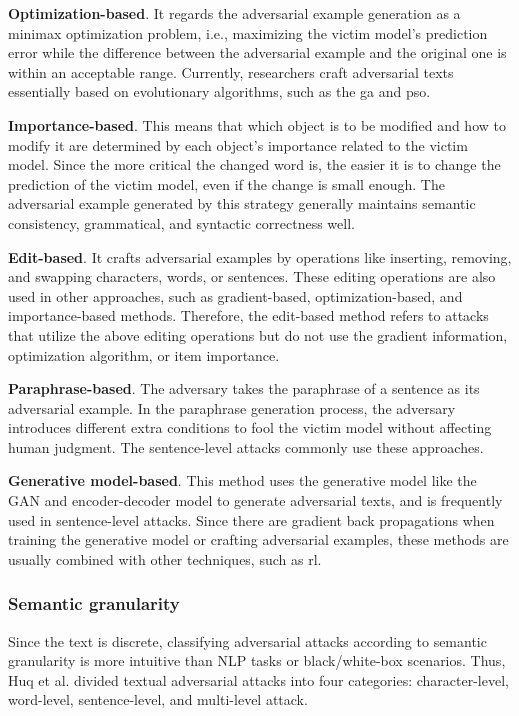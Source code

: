 \textbf{Optimization-based}. It regards the adversarial example generation as a minimax optimization problem, i.e., maximizing the victim model's prediction error while the difference between the adversarial example and the original one is within an acceptable range. Currently, researchers craft adversarial texts essentially based on evolutionary algorithms, such as the \acrshort{ga} and \acrshort{pso}.

\textbf{Importance-based}. This means that which object is to be modified and how to modify it are determined by each object's importance related to the victim model. Since the more critical the changed word is, the easier it is to change the prediction of the victim model, even if the change is small enough. The adversarial example generated by this strategy generally maintains semantic consistency, grammatical, and syntactic correctness well.

\textbf{Edit-based}. It crafts adversarial examples by operations like inserting, removing, and swapping characters, words, or sentences. These editing operations are also used in other approaches, such as gradient-based, optimization-based, and importance-based methods. Therefore, the edit-based method refers to attacks that utilize the above editing operations but do not use the gradient information, optimization algorithm, or item importance.

\textbf{Paraphrase-based}. The adversary takes the paraphrase of a sentence as its adversarial example. In the paraphrase generation process, the adversary introduces different extra conditions to fool the victim model without affecting human judgment. The sentence-level attacks commonly use these approaches.

\textbf{Generative model-based}. This method uses the generative model like the GAN and encoder-decoder model to generate adversarial texts, and is frequently used in sentence-level attacks. Since there are gradient back propagations when training the generative model or crafting adversarial examples, these methods are usually combined with other techniques, such as \acrshort{rl}.

\subsubsection{Semantic granularity}\label{subsubsec:semantic-granularity}

Since the text is discrete, classifying adversarial attacks according to semantic granularity is more intuitive than NLP tasks or black/white-box scenarios.
Thus, Huq et al. \cite{https://doi.org/10.48550/arxiv.2005.14108} divided textual adversarial attacks into four categories: character-level, word-level, sentence-level, and multi-level attack.

